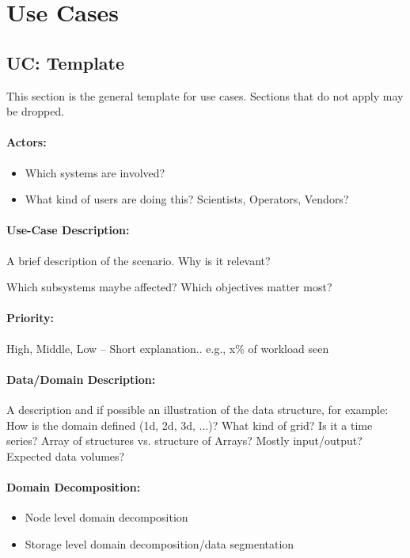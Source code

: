\section{Use Cases}

\subsection{UC: Template}

This section is the general template for use cases.
Sections that do not apply may be dropped.

\paragraph{Actors:}
\begin{itemize}
	\item Which systems are involved?
	\item What kind of users are doing this? Scientists, Operators, Vendors?
\end{itemize}

\paragraph{Use-Case Description:}
A brief description of the scenario.
Why is it relevant?

Which subsystems maybe affected?
Which objectives matter most?

\paragraph{Priority:}
High, Middle, Low -- Short explanation.. e.g., x\% of workload seen


\paragraph{Data/Domain Description:}
A description and if possible an illustration of the data structure, for example:
How is the domain defined (1d, 2d, 3d, ...)?
What kind of grid?
Is it a time series?
Array of structures vs. structure of Arrays?
Mostly input/output?
Expected data volumes?

\paragraph{Domain Decomposition:}
\begin{itemize}
	\item Node level domain decomposition
	\item Storage level domain decomposition/data segmentation
\end{itemize}

